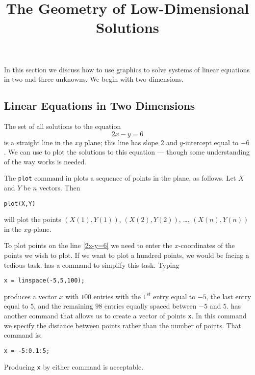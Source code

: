 \documentclass{ximera}
\title{The Geometry of Low-Dimensional Solutions}
\begin{document}
\begin{abstract}
\end{abstract}
\maketitle


\label{S:2.2}

In this section we discuss how to use \Matlab graphics to solve
systems of linear equations in two and three unknowns.  We begin
with two dimensions.

\subsection*{Linear Equations in Two Dimensions}

The set of all solutions to the equation
\begin{equation} \label{2x-y=6}
2x - y = 6
\end{equation}
is a straight line in the $xy$ plane; this line
has slope $2$ and $y$-intercept equal to $-6$.  We can use
\Matlab to plot the solutions to this equation --- though some
understanding of the way \Matlab works is needed.

The {\tt plot} command in \Matlab plots a sequence of points in
the plane, as follows.  Let $X$ and $Y$ be $n$ vectors. Then
\begin{verbatim}
plot(X,Y)
\end{verbatim} 
will plot the points $(X(1),Y(1))$, $(X(2),Y(2))$, \ldots,
$(X(n),Y(n))$ in the $xy$-plane.  

To plot points on the line
\eqref{2x-y=6} we need to enter the $x$-coordinates of the points
we wish to plot.  If we want to plot a hundred points, we would
be facing a tedious task.  \Matlab has a command to simplify
this task. Typing
\begin{verbatim}
x = linspace(-5,5,100);
\end{verbatim} 
produces a vector $x$ with $100$ entries with the $1^{st}$ entry
equal to $-5$, the last entry equal to $5$, and the remaining $98$ 
entries equally spaced between $-5$ and $5$.  \Matlab has another command 
that allows us to create a vector of points {\tt x}.  In this command
we specify the distance between points rather than the number of 
points.  That command is:
\begin{verbatim}
x = -5:0.1:5;
\end{verbatim}
Producing {\tt x} by either command is acceptable.
\end{document}
